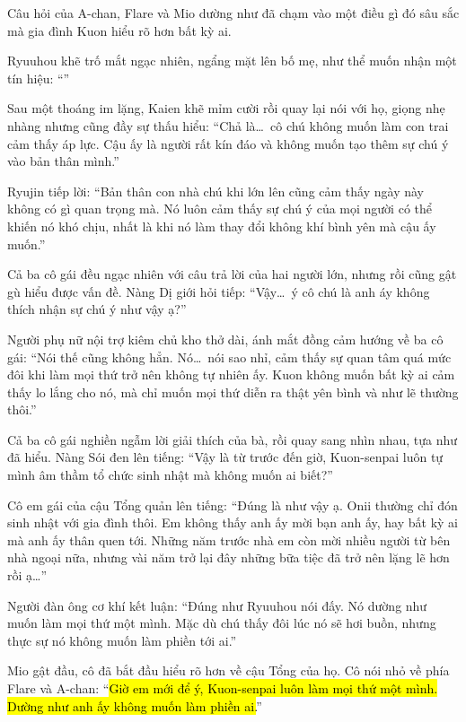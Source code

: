 \documentclass[../main.tex]{subfiles}
\begin{document}
Câu hỏi của A-chan, Flare và Mio dường như đã chạm vào một điều gì đó sâu sắc mà gia đình Kuon hiểu rõ hơn bất kỳ ai.

Ryuuhou khẽ trố mắt ngạc nhiên, ngẩng mặt lên bố mẹ, như thể muốn nhận một tín hiệu: ``''

Sau một thoáng im lặng, Kaien khẽ mỉm cười rồi quay lại nói với họ, giọng nhẹ nhàng nhưng cũng đầy sự thấu hiểu: ``Chả là\dots\ cô chú không muốn làm con trai cảm thấy áp lực. Cậu ấy là người rất kín đáo và không muốn tạo thêm sự chú ý vào bản thân mình.''

Ryujin tiếp lời: ``Bản thân con nhà chú khi lớn lên cũng cảm thấy ngày này không có gì quan trọng mà. Nó luôn cảm thấy sự chú ý của mọi người có thể khiến nó khó chịu, nhất là khi nó làm thay đổi không khí bình yên mà cậu ấy muốn.''

Cả ba cô gái đều ngạc nhiên với câu trả lời của hai người lớn, nhưng rồi cũng gật gù hiểu được vấn đề. Nàng Dị giới hỏi tiếp: ``Vậy\dots\ ý cô chú là anh áy không thích nhận sự chú ý như vậy ạ?''

Người phụ nữ nội trợ kiêm chủ kho thở dài, ánh mắt đồng cảm hướng về ba cô gái: ``Nói thế cũng không hẳn. Nó\dots\ nói sao nhỉ, cảm thấy sự quan tâm quá mức đôi khi làm mọi thứ trở nên không tự nhiên ấy. Kuon không muốn bất kỳ ai cảm thấy lo lắng cho nó, mà chỉ muốn mọi thứ diễn ra thật yên bình và như lẽ thường thôi.''

Cả ba cô gái nghiền ngẫm lời giải thích của bà, rồi quay sang nhìn nhau, tựa như đã hiểu. Nàng Sói đen lên tiếng: ``Vậy là từ trước đến giờ, Kuon-senpai luôn tự mình âm thầm tổ chức sinh nhật mà không muốn ai biết?''

Cô em gái của cậu Tổng quản lên tiếng: ``Đúng là như vậy ạ. Onii thường chỉ đón sinh nhật với gia đình thôi. Em không thấy anh ấy mời bạn anh ấy, hay bất kỳ ai mà anh ấy thân quen tới. Những năm trước nhà em còn mời nhiều người từ bên nhà ngoại nữa, nhưng vài năm trở lại đây những bữa tiệc đã trở nên lặng lẽ hơn rồi ạ\dots''

Người đàn ông cơ khí kết luận: ``Đúng như Ryuuhou nói đấy. Nó dường như muốn làm mọi thứ một mình. Mặc dù chú thấy đôi lúc nó sẽ hơi buồn, nhưng thực sự nó không muốn làm phiền tới ai.''

Mio gật đầu, cô đã bắt đầu hiểu rõ hơn về cậu Tổng của họ. Cô nói nhỏ về phía Flare và A-chan: ``\hl{Giờ em mới để ý, Kuon-senpai luôn làm mọi thứ một mình. Dường như anh ấy không muốn làm phiền ai.}''
\end{document}
